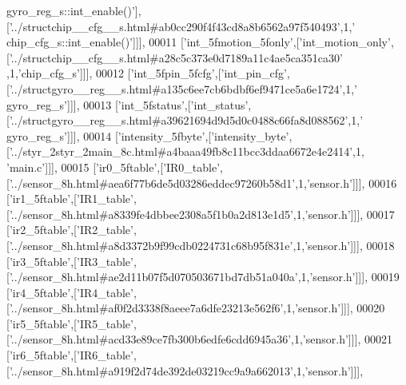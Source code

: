 \begin{DoxyCode}
{      gyro\_reg\_s::int\_enable()'}],[\textcolor{stringliteral}{'../structchip\_\_cfg\_\_s.html#ab0cc290f4f43cd8a8b6562a97f540493'},1,\textcolor{stringliteral}{'
      chip\_cfg\_s::int\_enable()'}]]],
00011   [\textcolor{stringliteral}{'int\_5fmotion\_5fonly'},[\textcolor{stringliteral}{'int\_motion\_only'},[\textcolor{stringliteral}{'../structchip\_\_cfg\_\_s.html#a28c5c373e0d7189a11c4ae5ca351ca30'}
      ,1,\textcolor{stringliteral}{'chip\_cfg\_s'}]]],
00012   [\textcolor{stringliteral}{'int\_5fpin\_5fcfg'},[\textcolor{stringliteral}{'int\_pin\_cfg'},[\textcolor{stringliteral}{'../structgyro\_\_reg\_\_s.html#a135c6ee7cb6bdbf6ef9471ce5a6e1724'},1,\textcolor{stringliteral}{'
      gyro\_reg\_s'}]]],
00013   [\textcolor{stringliteral}{'int\_5fstatus'},[\textcolor{stringliteral}{'int\_status'},[\textcolor{stringliteral}{'../structgyro\_\_reg\_\_s.html#a39621694d9d5d0c0488c66fa8d088562'},1,\textcolor{stringliteral}{'
      gyro\_reg\_s'}]]],
00014   [\textcolor{stringliteral}{'intensity\_5fbyte'},[\textcolor{stringliteral}{'intensity\_byte'},[\textcolor{stringliteral}{'../styr\_2styr\_2main\_8c.html#a4baaa49fb8c11bcc3ddaa6672e4e2414'},1,\textcolor{stringliteral}{
      'main.c'}]]],
00015   [\textcolor{stringliteral}{'ir0\_5ftable'},[\textcolor{stringliteral}{'IR0\_table'},[\textcolor{stringliteral}{'../sensor\_8h.html#aea6f77b6de5d03286eddec97260b58d1'},1,\textcolor{stringliteral}{'sensor.h'}]]],
00016   [\textcolor{stringliteral}{'ir1\_5ftable'},[\textcolor{stringliteral}{'IR1\_table'},[\textcolor{stringliteral}{'../sensor\_8h.html#a8339fe4dbbee2308a5f1b0a2d813e1d5'},1,\textcolor{stringliteral}{'sensor.h'}]]],
00017   [\textcolor{stringliteral}{'ir2\_5ftable'},[\textcolor{stringliteral}{'IR2\_table'},[\textcolor{stringliteral}{'../sensor\_8h.html#a8d3372b9f99cdb0224731c68b95f831e'},1,\textcolor{stringliteral}{'sensor.h'}]]],
00018   [\textcolor{stringliteral}{'ir3\_5ftable'},[\textcolor{stringliteral}{'IR3\_table'},[\textcolor{stringliteral}{'../sensor\_8h.html#ae2d11b07f5d070503671bd7db51a040a'},1,\textcolor{stringliteral}{'sensor.h'}]]],
00019   [\textcolor{stringliteral}{'ir4\_5ftable'},[\textcolor{stringliteral}{'IR4\_table'},[\textcolor{stringliteral}{'../sensor\_8h.html#af0f2d3338f8aeee7a6dfe23213e562f6'},1,\textcolor{stringliteral}{'sensor.h'}]]],
00020   [\textcolor{stringliteral}{'ir5\_5ftable'},[\textcolor{stringliteral}{'IR5\_table'},[\textcolor{stringliteral}{'../sensor\_8h.html#acd33e89ce7fb300b6edfe6cdd6945a36'},1,\textcolor{stringliteral}{'sensor.h'}]]],
00021   [\textcolor{stringliteral}{'ir6\_5ftable'},[\textcolor{stringliteral}{'IR6\_table'},[\textcolor{stringliteral}{'../sensor\_8h.html#a919f2d74de392de03219cc9a9a662013'},1,\textcolor{stringliteral}{'sensor.h'}]]],

\end{DoxyCode}
